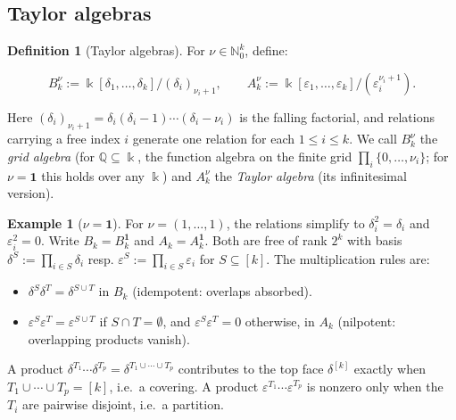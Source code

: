 \documentclass[10pt,a4paper]{article}
\theoremstyle{plain}
\theoremstyle{definition}
\newtheorem{definition}[theorem]{Definition}
\newtheorem{example}[theorem]{Example}
\newcommand{\IN}{\mathbb{N}} %
\newcommand{\IQ}{\mathbb{Q}} %
\newcommand{\ik}{\Bbbk} %
\newcommand{\1}{\mathbb{1}} %
\newcommand{\set}[1]{\{#1\}} %
\newcommand{\eps}{\varepsilon} %
\newcommand{\tightlist}{\setlength{\itemsep}{0pt}\setlength{\parskip}{0pt}}
\begin{document}
\subsection{Taylor algebras}\label{taylor-algebras}

\begin{definition}[Taylor algebras]

\label{def:taylor-algebras} For \(\nu \in \IN_0^k\), define:

\[
  B_k^\nu := \ik[\delta_1, \dots, \delta_k] / (\delta_i)_{\nu_i+1}, \qquad A_k^\nu := \ik[\eps_1, \dots, \eps_k] / (\eps_i^{\nu_i+1}).
\]

Here
\((\delta_i)_{\nu_i+1} = \delta_i(\delta_i - 1) \cdots (\delta_i - \nu_i)\)
is the falling factorial, and relations carrying a free index \(i\)
generate one relation for each \(1 \leq i \leq k\). We call \(B_k^\nu\)
the \emph{grid algebra} (for \(\IQ \subseteq \ik\), the function algebra
on the finite grid \(\prod_i \set{0, \dots, \nu_i}\); for
\(\nu = \mathbf{1}\) this holds over any \(\ik\)) and \(A_k^\nu\) the
\emph{Taylor algebra} (its infinitesimal version).

\end{definition}

\begin{example}[$\nu = \mathbf{1}$]

\label{ex:cube-algebras} For \(\nu = (1, \dots, 1)\), the relations
simplify to \(\delta_i^2 = \delta_i\) and \(\eps_i^2 = 0\). Write
\(B_k = B_k^{\mathbf{1}}\) and \(A_k = A_k^{\mathbf{1}}\). Both are free
of rank \(2^k\) with basis \(\delta^S := \prod_{i \in S} \delta_i\)
resp. \(\eps^S := \prod_{i \in S} \eps_i\) for \(S \subseteq [k]\). The
multiplication rules are:

\begin{itemize}
\tightlist
\item
  \(\delta^S \delta^T = \delta^{S \cup T}\) in \(B_k\) (idempotent:
  overlaps absorbed).
\item
  \(\eps^S \eps^T = \eps^{S \cup T}\) if \(S \cap T = \emptyset\), and
  \(\eps^S \eps^T = 0\) otherwise, in \(A_k\) (nilpotent: overlapping
  products vanish).
\end{itemize}

A product
\(\delta^{T_1} \cdots \delta^{T_p} = \delta^{T_1 \cup \cdots \cup T_p}\)
contributes to the top face \(\delta^{[k]}\) exactly when
\(T_1 \cup \cdots \cup T_p = [k]\), i.e.~a covering. A product
\(\eps^{T_1} \cdots \eps^{T_p}\) is nonzero only when the \(T_i\) are
pairwise disjoint, i.e.~a partition.

\end{example}
\end{document}

